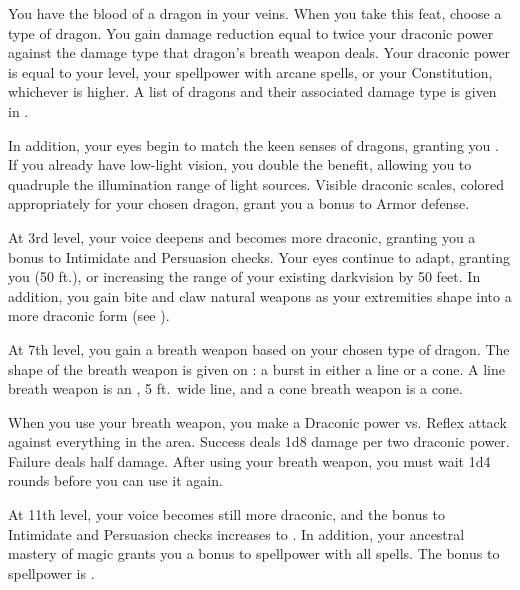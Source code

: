     \featben You have the blood of a dragon in your veins.
    When you take this feat, choose a type of dragon.
    You gain damage reduction equal to twice your draconic power against the damage type that dragon's breath weapon deals.
    Your draconic power is equal to your level, your spellpower with arcane spells, or your Constitution, whichever is higher.
    A list of dragons and their associated damage type is given in .

    In addition, your eyes begin to match the keen senses of dragons, granting you .
    If you already have low-light vision, you double the benefit, allowing you to quadruple the illumination range of light sources.
    Visible draconic scales, colored appropriately for your chosen dragon, grant you a  bonus to Armor defense.

    At 3rd level, your voice deepens and becomes more draconic, granting you a  bonus to Intimidate and Persuasion checks.
    Your eyes continue to adapt, granting you  (50 ft.), or increasing the range of your existing darkvision by 50 feet.
    In addition, you gain bite and claw natural weapons as your extremities shape into a more draconic form (see ).

    At 7th level, you gain a breath weapon based on your chosen type of dragon.
    The shape of the breath weapon is given on : a burst in either a line or a cone.
    A line breath weapon is an \arealarge, 5 ft.\ wide line, and a cone breath weapon is a \areamed cone.

    When you use your breath weapon, you make a Draconic power vs. Reflex attack against everything in the area.
    Success deals 1d8 damage per two draconic power.
    Failure deals half damage.
    After using your breath weapon, you must wait 1d4 rounds before you can use it again.

    At 11th level, your voice becomes still more draconic, and the bonus to Intimidate and Persuasion checks increases to .
    In addition, your ancestral mastery of magic grants you a  bonus to spellpower with all spells.
    The bonus to spellpower is .

